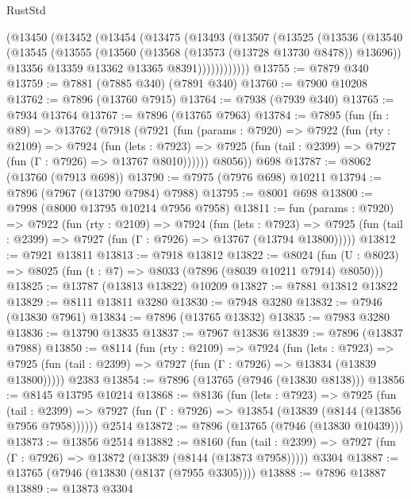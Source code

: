 \begin{lexlean}{RustStd}
\begin{coremodule}
      (@13450
        (@13452
          (@13454
            (@13475
              (@13493
                (@13507
                  (@13525
                    (@13536
                      (@13540
                        (@13545
                          (@13555
                            (@13560 (@13568 (@13573 (@13728 @13730 @8478)) @13696))
                            @13356
                            @13359
                            @13362
                            @13365
                            @8391))))))))))))
@13755 := @7879 @340
@13759 := @7881 (@7885 @340) (@7891 @340)
@13760 := @7900 @10208
@13762 := @7896 (@13760 @7915)
@13764 := @7938 (@7939 @340)
@13765 := @7934 @13764
@13767 := @7896 (@13765 @7963)
@13784 := @7895
    (fun (fn : @89) =>
    @13762
      (@7918
        (@7921
          (fun (params : @7920) =>
          @7922
            (fun (rty : @2109) =>
            @7924
              (fun (lets : @7923) =>
              @7925 (fun (tail : @2399) => @7927 (fun (Γ : @7926) => @13767 @8010))))))
        @8056))
    @698
@13787 := @8062 (@13760 (@7913 @698))
@13790 := @7975 (@7976 @698) @10211
@13794 := @7896 (@7967 (@13790 @7984) @7988)
@13795 := @8001 @698
@13800 := @7998 (@8000 @13795 @10214 @7956 @7958)
@13811 := fun (params : @7920) =>
  @7922
    (fun (rty : @2109) =>
    @7924
      (fun (lets : @7923) =>
      @7925 (fun (tail : @2399) => @7927 (fun (Γ : @7926) => @13767 (@13794 @13800)))))
@13812 := @7921 @13811
@13813 := @7918 @13812
@13822 := @8024
    (fun (U : @8023) => @8025 (fun (t : @7) => @8033 (@7896 (@8039 @10211 @7914) @8050)))
@13825 := @13787 (@13813 @13822) @10209
@13827 := @7881 @13812 @13822
@13829 := @8111 @13811 @3280
@13830 := @7948 @3280
@13832 := @7946 (@13830 @7961)
@13834 := @7896 (@13765 @13832)
@13835 := @7983 @3280
@13836 := @13790 @13835
@13837 := @7967 @13836
@13839 := @7896 (@13837 @7988)
@13850 := @8114
    (fun (rty : @2109) =>
    @7924
      (fun (lets : @7923) =>
      @7925 (fun (tail : @2399) => @7927 (fun (Γ : @7926) => @13834 (@13839 @13800)))))
    @2383
@13854 := @7896 (@13765 (@7946 (@13830 @8138)))
@13856 := @8145 @13795 @10214
@13868 := @8136
    (fun (lets : @7923) =>
    @7925
      (fun (tail : @2399) =>
      @7927 (fun (Γ : @7926) => @13854 (@13839 (@8144 (@13856 @7956 @7958))))))
    @2514
@13872 := @7896 (@13765 (@7946 (@13830 @10439)))
@13873 := @13856 @2514
@13882 := @8160
    (fun (tail : @2399) => @7927 (fun (Γ : @7926) => @13872 (@13839 (@8144 (@13873 @7958)))))
    @3304
@13887 := @13765 (@7946 (@13830 (@8137 (@7955 @3305))))
@13888 := @7896 @13887
@13889 := @13873 @3304

\end{coremodule}
\end{lexlean}
